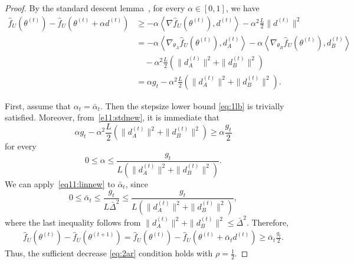 \documentclass{article}
\begin{document}
\begin{proof}
By the standard descent lemma~\cite[Proposition 6.1.2]{bertsekas2015convex}, for every
\(\alpha\in[0,1]\), we have
\begin{equation}\label{e11:stdnew}
\begin{aligned}
    \widehat f_U(\theta^{(t)})
    -
    \widehat f_U(\theta^{(t)}+\alpha d^{(t)})
    &\ge
    -
    \alpha
    \left\langle
        \nabla \widehat f_U(\theta^{(t)}),
        d^{(t)}
    \right\rangle
    -
    \alpha^2
    \frac{L}{2}
    \|d^{(t)}\|^2                                      \\
    &=
    -
    \alpha
    \left\langle
        \nabla_{\theta_A}\widehat f_U(\theta^{(t)}),
        d_A^{(t)}
    \right\rangle
    -
    \alpha
    \left\langle
        \nabla_{\theta_B}\widehat f_U(\theta^{(t)}),
        d_B^{(t)}
    \right\rangle                                      \\
    &\quad
    -
    \alpha^2
    \frac{L}{2}
    \left(
        \|d_A^{(t)}\|^2+\|d_B^{(t)}\|^2
    \right)                                            \\
    &=
    \alpha g_t
    -
    \alpha^2
    \frac{L}{2}
    \left(
        \|d_A^{(t)}\|^2+\|d_B^{(t)}\|^2
    \right).
\end{aligned}
\end{equation}

First, assume that \(\alpha_t=\bar\alpha_t\). Then the stepsize lower bound \eqref{eq:1lb} is trivially
satisfied. Moreover, from~\eqref{e11:stdnew}, it is immediate that
\begin{equation}\label{eq11:linnew}
    \alpha g_t
    -
    \alpha^2
    \frac{L}{2}
    \left(
        \|d_A^{(t)}\|^2+\|d_B^{(t)}\|^2
    \right)
    \ge
    \alpha \frac{g_t}{2}
\end{equation}
for every
\[
    0\le \alpha
    \le
    \frac{
        g_t
    }{
        L\left(
            \|d_A^{(t)}\|^2+\|d_B^{(t)}\|^2
        \right)
    }.
\]
We can apply~\eqref{eq11:linnew} to \(\bar\alpha_t\), since
\[
    0
    \le
    \bar\alpha_t
    \le
    \frac{g_t}{L\bar\Delta^2}
    \le
    \frac{
        g_t
    }{
        L\left(
            \|d_A^{(t)}\|^2+\|d_B^{(t)}\|^2
        \right)
    },
\]
where the last inequality follows from $\|d_A^{(t)}\|^2+\|d_B^{(t)}\|^2
    \le
    \bar\Delta^2$. Therefore,
\[
\begin{aligned}
    \widehat f_U(\theta^{(t)})
    -
    \widehat f_U(\theta^{(t+1)})
    =
    \widehat f_U(\theta^{(t)})
    -
    \widehat f_U(\theta^{(t)}+\bar\alpha_t d^{(t)})      \ge
    \bar\alpha_t\frac{g_t}{2}.
\end{aligned}
\]
Thus, the sufficient decrease \eqref{eq:2ar} condition holds with \(\rho=\frac12\).


\end{proof}
\end{document}
